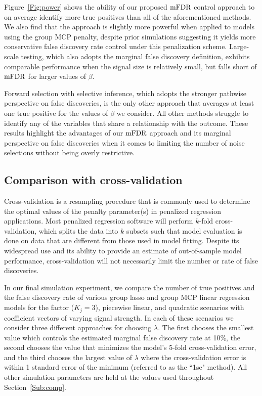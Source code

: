 Figure~\ref{Fig:power} shows the ability of our proposed $\textrm{mFDR}$ control approach to on average identify more true positives than all of the aforementioned methods. We also find that the approach is slightly more powerful when applied to models using the group MCP penalty, despite prior simulations suggesting it yields more conservative false discovery rate control under this penalization scheme. Large-scale testing, which also adopts the marginal false discovery definition, exhibits comparable performance when the signal size is relatively small, but falls short of $\textrm{mFDR}$ for larger values of $\beta$. 

Forward selection with selective inference, which adopts the stronger pathwise perspective on false discoveries, is the only other approach that averages at least one true positive for the values of $\beta$ we consider. All other methods struggle to identify any of the variables that share a relationship with the outcome. These results highlight the advantages of our $\textrm{mFDR}$ approach and its marginal perspective on false discoveries when it comes to limiting the number of noise selections without being overly restrictive.

\subsection{Comparison with cross-validation}

Cross-validation is a resampling procedure that is commonly used to determine the optimal values of the penalty parameter(s) in penalized regression applications. Most penalized regression software will perform $k$-fold cross-validation, which splits the data into $k$ subsets such that model evaluation is done on data that are different from those used in model fitting. Despite its widespread use and its ability to provide an estimate of out-of-sample model performance, cross-validation will not necessarily limit the number or rate of false discoveries.

In our final simulation experiment, we compare the number of true positives and the false discovery rate of various group lasso and group MCP linear regression models for the factor ($K_j = 3$), piecewise linear, and quadratic scenarios with coefficient vectors of varying signal strength. In each of these scenarios we consider three different approaches for choosing $\lambda$. The first chooses the smallest value which controls the estimated marginal false discovery rate at 10\%, the second chooses the value that minimizes the model's 5-fold cross-validation error, and the third chooses the largest value of $\lambda$ where the cross-validation error is within 1 standard error of the minimum (referred to as the ``1se" method). All other simulation parameters are held at the values used throughout Section~\ref{Sub:comp}.

